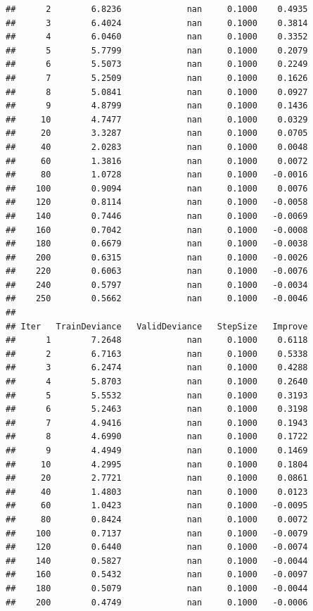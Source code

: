 \documentclass[
]{book}
\begin{document}
\begin{verbatim}
##      2        6.8236             nan     0.1000    0.4935
##      3        6.4024             nan     0.1000    0.3814
##      4        6.0460             nan     0.1000    0.3352
##      5        5.7799             nan     0.1000    0.2079
##      6        5.5073             nan     0.1000    0.2249
##      7        5.2509             nan     0.1000    0.1626
##      8        5.0841             nan     0.1000    0.0927
##      9        4.8799             nan     0.1000    0.1436
##     10        4.7477             nan     0.1000    0.0329
##     20        3.3287             nan     0.1000    0.0705
##     40        2.0283             nan     0.1000    0.0048
##     60        1.3816             nan     0.1000    0.0072
##     80        1.0728             nan     0.1000   -0.0016
##    100        0.9094             nan     0.1000    0.0076
##    120        0.8114             nan     0.1000   -0.0058
##    140        0.7446             nan     0.1000   -0.0069
##    160        0.7042             nan     0.1000   -0.0008
##    180        0.6679             nan     0.1000   -0.0038
##    200        0.6315             nan     0.1000   -0.0026
##    220        0.6063             nan     0.1000   -0.0076
##    240        0.5797             nan     0.1000   -0.0034
##    250        0.5662             nan     0.1000   -0.0046
## 
## Iter   TrainDeviance   ValidDeviance   StepSize   Improve
##      1        7.2648             nan     0.1000    0.6118
##      2        6.7163             nan     0.1000    0.5338
##      3        6.2474             nan     0.1000    0.4288
##      4        5.8703             nan     0.1000    0.2640
##      5        5.5532             nan     0.1000    0.3193
##      6        5.2463             nan     0.1000    0.3198
##      7        4.9416             nan     0.1000    0.1943
##      8        4.6990             nan     0.1000    0.1722
##      9        4.4949             nan     0.1000    0.1469
##     10        4.2995             nan     0.1000    0.1804
##     20        2.7721             nan     0.1000    0.0861
##     40        1.4803             nan     0.1000    0.0123
##     60        1.0423             nan     0.1000   -0.0095
##     80        0.8424             nan     0.1000    0.0072
##    100        0.7137             nan     0.1000   -0.0079
##    120        0.6440             nan     0.1000   -0.0074
##    140        0.5827             nan     0.1000   -0.0044
##    160        0.5432             nan     0.1000   -0.0097
##    180        0.5079             nan     0.1000   -0.0044
##    200        0.4749             nan     0.1000   -0.0006

\end{verbatim}
\end{document}
